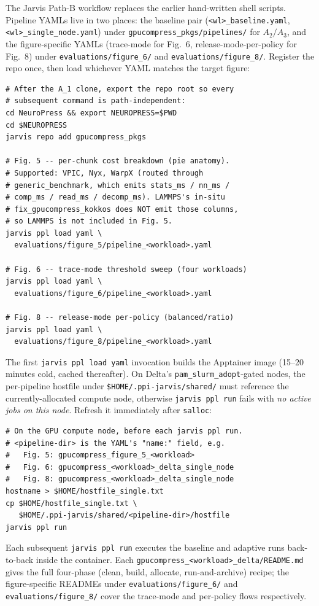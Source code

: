 \documentclass[conference]{IEEEtran}
\begin{document}
The Jarvis Path-B workflow replaces the earlier hand-written
shell scripts. Pipeline YAMLs live in two places: the
baseline pair (\texttt{<wl>\_baseline.yaml},
\texttt{<wl>\_single\_node.yaml}) under
\texttt{gpucompress\_pkgs/pipelines/} for $A_2/A_3$, and the
figure-specific YAMLs (trace-mode for Fig.~6,
release-mode-per-policy for Fig.~8) under
\texttt{evaluations/figure\_6/} and
\texttt{evaluations/figure\_8/}. Register the repo once, then
load whichever YAML matches the target figure:
\begin{verbatim}
# After the A_1 clone, export the repo root so every
# subsequent command is path-independent:
cd NeuroPress && export NEUROPRESS=$PWD
cd $NEUROPRESS
jarvis repo add gpucompress_pkgs

# Fig. 5 -- per-chunk cost breakdown (pie anatomy).
# Supported: VPIC, Nyx, WarpX (routed through
# generic_benchmark, which emits stats_ms / nn_ms /
# comp_ms / read_ms / decomp_ms). LAMMPS's in-situ
# fix_gpucompress_kokkos does NOT emit those columns,
# so LAMMPS is not included in Fig. 5.
jarvis ppl load yaml \
  evaluations/figure_5/pipeline_<workload>.yaml

# Fig. 6 -- trace-mode threshold sweep (four workloads)
jarvis ppl load yaml \
  evaluations/figure_6/pipeline_<workload>.yaml

# Fig. 8 -- release-mode per-policy (balanced/ratio)
jarvis ppl load yaml \
  evaluations/figure_8/pipeline_<workload>.yaml
\end{verbatim}
The first \texttt{jarvis ppl load yaml} invocation builds the
Apptainer image (15--20 minutes cold, cached thereafter). On
Delta's \texttt{pam\_slurm\_adopt}-gated nodes, the
per-pipeline hostfile under
\texttt{\$HOME/.ppi-jarvis/shared/} must reference the
currently-allocated compute node, otherwise \texttt{jarvis
ppl run} fails with \emph{no active jobs on this node}.
Refresh it immediately after \texttt{salloc}:
\begin{verbatim}
# On the GPU compute node, before each jarvis ppl run.
# <pipeline-dir> is the YAML's "name:" field, e.g.
#   Fig. 5: gpucompress_figure_5_<workload>
#   Fig. 6: gpucompress_<workload>_delta_single_node
#   Fig. 8: gpucompress_<workload>_delta_single_node
hostname > $HOME/hostfile_single.txt
cp $HOME/hostfile_single.txt \
   $HOME/.ppi-jarvis/shared/<pipeline-dir>/hostfile
jarvis ppl run
\end{verbatim}
Each subsequent \texttt{jarvis ppl run} executes the baseline
and adaptive runs back-to-back inside the container. Each
\texttt{gpucompress\_<workload>\_delta/README.md} gives the
full four-phase (clean, build, allocate, run-and-archive)
recipe; the figure-specific READMEs under
\texttt{evaluations/figure\_6/} and
\texttt{evaluations/figure\_8/} cover the trace-mode and
per-policy flows respectively.
\end{document}
